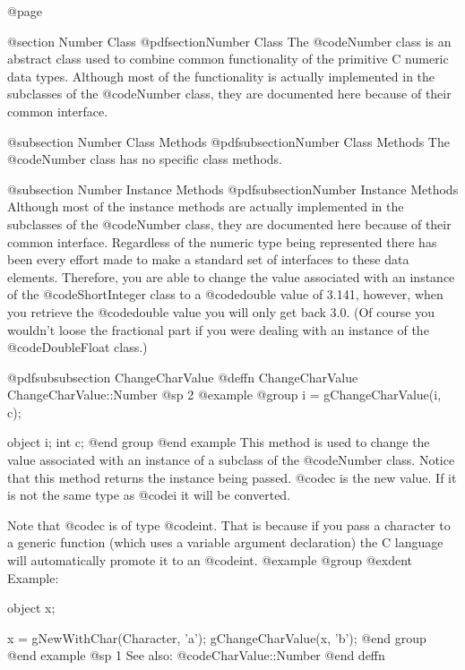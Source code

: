 @page

@section Number Class
@pdfsection{Number Class}
The @code{Number} class is an abstract class used to combine common
functionality of the primitive C numeric data types.  Although most of the
functionality is actually implemented in the subclasses of the @code{Number}
class, they are documented here because of their common interface.


@subsection Number Class Methods
@pdfsubsection{Number Class Methods}
The @code{Number} class has no specific class methods.


@subsection Number Instance Methods
@pdfsubsection{Number Instance Methods}
Although most of the instance methods are actually implemented in the
subclasses of the @code{Number} class, they are documented here because
of their common interface.  Regardless of the numeric type being
represented there has been every effort made to make a standard set of
interfaces to these data elements.  Therefore, you are able to change
the value associated with an instance of the @code{ShortInteger} class
to a @code{double} value of 3.141, however, when you retrieve the
@code{double} value you will only get back 3.0.  (Of course you
wouldn't loose the fractional part if you were dealing with an instance
of the @code{DoubleFloat} class.)





@pdfsubsubsection {ChangeCharValue}
@deffn {ChangeCharValue} ChangeCharValue::Number
@sp 2
@example
@group
i = gChangeCharValue(i, c);

object  i;
int     c;
@end group
@end example
This method is used to change the value associated with an instance of
a subclass of the @code{Number} class.  Notice that this method
returns the instance being passed.  @code{c} is the new value.
If it is not the same type as @code{i} it will be converted.

Note that @code{c} is of type @code{int}.  That is because if you pass a
character to a generic function (which uses a variable argument
declaration) the C language will automatically promote it to an
@code{int}.
@example
@group
@exdent Example:

object  x;

x = gNewWithChar(Character, 'a');
gChangeCharValue(x, 'b');
@end group
@end example
@sp 1
See also:  @code{CharValue::Number}
@end deffn












